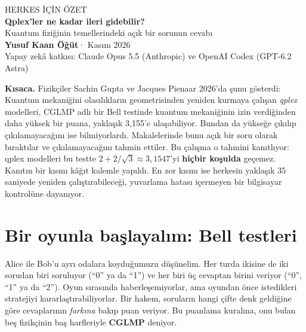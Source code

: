 \documentclass[11pt]{article}
\begin{document}
\thispagestyle{fancy}

\begin{tcolorbox}[enhanced,colback=ana,colframe=ana,arc=4pt,left=16pt,right=16pt,top=14pt,bottom=14pt]
\color{white}
{\sffamily\small HERKES İÇİN ÖZET}\\[6pt]
{\sffamily\bfseries\huge Qplex'ler ne kadar ileri gidebilir?}\\[6pt]
{\large Kuantum fiziğinin temellerindeki açık bir sorunun cevabı}\\[10pt]
{\sffamily\bfseries Yusuf Kaan Öğüt}{\sffamily\small \;· Kasım 2026}\\[2pt]
{\sffamily\small Yapay zekâ katkısı: Claude Opus 5.5 (Anthropic) ve OpenAI Codex (GPT-6.2 Astra)}
\end{tcolorbox}

\vspace{4pt}
\begin{ozet}
{\sffamily\bfseries\color{ana} Kısaca.}
Fizikçiler Sachin Gupta ve Jacques Pienaar 2026'da şunu gösterdi: Kuantum mekaniğini olasılıkların
geometrisinden yeniden kurmaya çalışan \emph{qplex} modelleri, CGLMP adlı bir Bell testinde kuantum
mekaniğinin izin verdiğinden daha yüksek bir puana, yaklaşık 3,155'e ulaşabiliyor. Bundan da yükseğe
çıkılıp çıkılamayacağını ise bilmiyorlardı. Makalelerinde bunu açık bir soru olarak bıraktılar ve
çıkılamayacağını tahmin ettiler. Bu çalışma o tahmini kanıtlıyor: qplex modelleri bu testte
$2+2/\sqrt3\approx3{,}1547$'yi \textbf{hiçbir koşulda} geçemez. Kanıtın bir kısmı kâğıt kalemle yapıldı. En
zor kısmı ise herkesin yaklaşık 35 saniyede yeniden çalıştırabileceği, yuvarlama hatası içermeyen bir
bilgisayar kontrolüne dayanıyor.
\end{ozet}

\section{Bir oyunla başlayalım: Bell testleri}

Alice ile Bob'u ayrı odalara koyduğumuzu düşünelim. Her turda ikisine de iki sorudan biri soruluyor
(“0” ya da “1”) ve her biri üç cevaptan birini veriyor (“0”, “1” ya da “2”). Oyun sırasında
haberleşemiyorlar, ama oyundan önce istedikleri stratejiyi kararlaştırabiliyorlar. Bir hakem, soruların
hangi çifte denk geldiğine göre cevaplarının \emph{farkına} bakıp puan veriyor. Bu puanlama kuralına,
onu bulan beş fizikçinin baş harfleriyle \textbf{CGLMP} deniyor.
\end{document}
